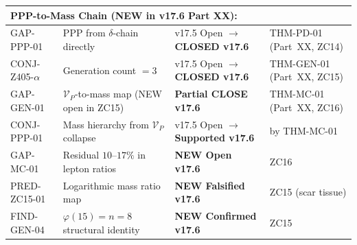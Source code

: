 \documentclass[12pt, a4paper]{article}
\begin{document}
\begin{keybox}[title={Master Z-Programme Status Table v17.6 (Canonical, Post-v17.6 Closures)}]
{\begin{longtable}{p{2.8cm} p{6.5cm} p{1.8cm} p{3.4cm}}
\midrule
\multicolumn{4}{l}{\textbf{PPP-to-Mass Chain (NEW in v17.6 Part XX):}} \\
\midrule
GAP-PPP-01 & PPP from $\delta$-chain directly
   & v17.5 Open $\to$ \textbf{CLOSED v17.6} & THM-PD-01 (Part~XX, ZC14) \\
CONJ-Z405-$\alpha$ & Generation count $= 3$
   & v17.5 Open $\to$ \textbf{CLOSED v17.6} & THM-GEN-01 (Part~XX, ZC15) \\
GAP-GEN-01 & $\mathcal{V}_P$-to-mass map (NEW open in ZC15)
   & \textbf{Partial CLOSE v17.6} & THM-MC-01 (Part~XX, ZC16) \\
CONJ-PPP-01 & Mass hierarchy from $\mathcal{V}_P$ collapse
   & v17.5 Open $\to$ \textbf{Supported v17.6} & by THM-MC-01 \\
GAP-MC-01 & Residual $10$--$17\%$ in lepton ratios
   & \textbf{NEW Open v17.6} & ZC16 \\
PRED-ZC15-01 & Logarithmic mass ratio map
   & \textbf{NEW Falsified v17.6} & ZC15 (scar tissue) \\
FIND-GEN-04 & $\varphi(15) = n = 8$ structural identity
   & \textbf{NEW Confirmed v17.6} & ZC15 \\


\end{longtable}}
\end{keybox}
\end{document}
